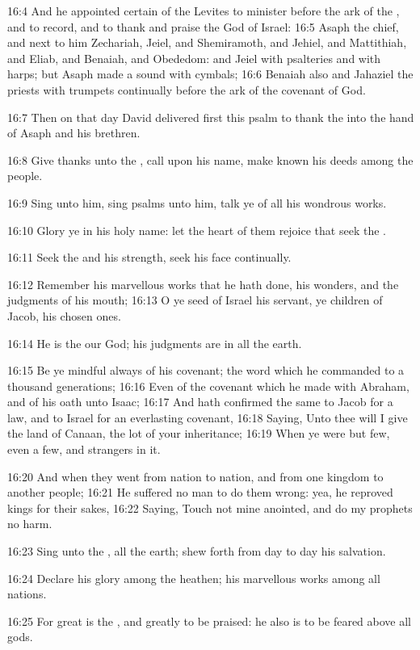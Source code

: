 16:4 And he appointed certain of the Levites to minister before the
ark of the \LORD, and to record, and to thank and praise the \LORD God
of Israel: 16:5 Asaph the chief, and next to him Zechariah, Jeiel, and
Shemiramoth, and Jehiel, and Mattithiah, and Eliab, and Benaiah, and
Obededom: and Jeiel with psalteries and with harps; but Asaph made a
sound with cymbals; 16:6 Benaiah also and Jahaziel the priests with
trumpets continually before the ark of the covenant of God.

16:7 Then on that day David delivered first this psalm to thank the
\LORD into the hand of Asaph and his brethren.

16:8 Give thanks unto the \LORD, call upon his name, make known his
deeds among the people.

16:9 Sing unto him, sing psalms unto him, talk ye of all his wondrous
works.

16:10 Glory ye in his holy name: let the heart of them rejoice that
seek the \LORD.

16:11 Seek the \LORD and his strength, seek his face continually.

16:12 Remember his marvellous works that he hath done, his wonders,
and the judgments of his mouth; 16:13 O ye seed of Israel his servant,
ye children of Jacob, his chosen ones.

16:14 He is the \LORD our God; his judgments are in all the earth.

16:15 Be ye mindful always of his covenant; the word which he
commanded to a thousand generations; 16:16 Even of the covenant which
he made with Abraham, and of his oath unto Isaac; 16:17 And hath
confirmed the same to Jacob for a law, and to Israel for an
everlasting covenant, 16:18 Saying, Unto thee will I give the land of
Canaan, the lot of your inheritance; 16:19 When ye were but few, even
a few, and strangers in it.

16:20 And when they went from nation to nation, and from one kingdom
to another people; 16:21 He suffered no man to do them wrong: yea, he
reproved kings for their sakes, 16:22 Saying, Touch not mine anointed,
and do my prophets no harm.

16:23 Sing unto the \LORD, all the earth; shew forth from day to day
his salvation.

16:24 Declare his glory among the heathen; his marvellous works among
all nations.

16:25 For great is the \LORD, and greatly to be praised: he also is to
be feared above all gods.

